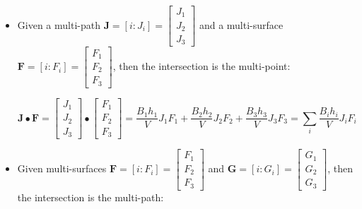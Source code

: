 \begin{itemize}
%


\item Given a multi-path \(\mathbf{J} = [i : J_i] = \begin{bmatrix} J_1 \\ J_2 \\ J_3 \end{bmatrix}\) and a multi-surface \(\mathbf{F} = [i : F_i] = \begin{bmatrix} F_1 \\ F_2 \\ F_3 \end{bmatrix}\), then the intersection is the multi-point:

\[\mathbf{J} \bullet \mathbf{F} = \begin{bmatrix} J_1 \\ J_2 \\ J_3 \end{bmatrix} \bullet \begin{bmatrix} F_1 \\ F_2 \\ F_3 \end{bmatrix} = \frac{B_1 h_1}{V} J_1 F_1 + \frac{B_2 h_2}{V} J_2 F_2 + \frac{B_3 h_3}{V} J_3 F_3 = \sum_i \frac{B_i h_i}{V} J_i F_i\]


%


\item Given multi-surfaces \(\mathbf{F} = [i : F_i] = \begin{bmatrix} F_1 \\ F_2 \\ F_3 \end{bmatrix}\) and \(\mathbf{G} = [i : G_i] = \begin{bmatrix} G_1 \\ G_2 \\ G_3 \end{bmatrix}\), then the intersection is the multi-path:


\end{itemize}

